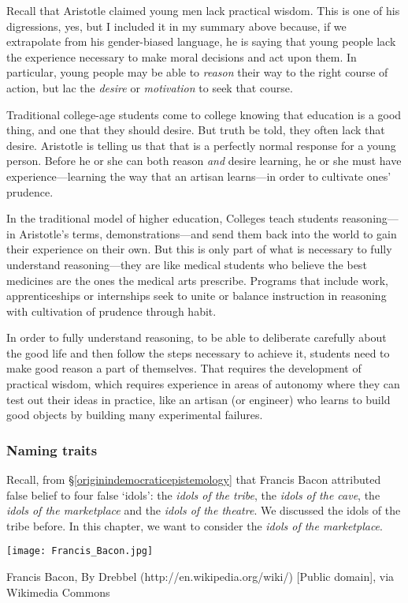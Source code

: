 Recall that Aristotle claimed young men lack practical wisdom. This is one of his digressions, yes, but I included it in my summary above because, if we extrapolate from his gender-biased language, he is saying that young people lack the experience necessary to make moral decisions and act upon them. In particular, young people may be able to \emph{reason} their way to the right course of action, but lac the \emph{desire} or \emph{motivation} to seek that course. 

Traditional college-age students come to college knowing that education is a good thing, and one that they should desire. But truth be told, they often lack that desire. Aristotle is telling us that that is a perfectly normal response for a young person. Before he or she can both reason \emph{and} desire learning, he or she must have experience---learning the way that an artisan learns---in order to cultivate ones' prudence.

In the traditional model of higher education, Colleges teach students reasoning---in Aristotle's terms, demonstrations---and send them back into the world to gain their experience on their own. But this is only part of what is necessary to fully understand reasoning---they are like medical students who believe the best medicines are the ones the medical arts prescribe. Programs that include work, apprenticeships or internships seek to unite or balance instruction in reasoning with cultivation of prudence through habit. 

In order to fully understand reasoning, to be able to deliberate carefully about the good life and then follow the steps necessary to achieve it, students need to make good reason a part of themselves. That requires the development of practical wisdom, which requires experience in areas of autonomy where they can test out their ideas in practice, like an artisan (or engineer) who learns to build good objects by building many experimental failures.

\subsubsection{Naming traits}
\label{namingtraits}

Recall, from \S\ref{originindemocraticepistemology} that Francis Bacon attributed false belief to four false `idols': the \emph{idols of the tribe}, the \emph{idols of the cave}, the \emph{idols of the marketplace} and the \emph{idols of the theatre}. We discussed the idols of the tribe before. In this chapter, we want to consider the \emph{idols of the marketplace}.\begin{marginfigure}\texttt{[image: Francis\_Bacon.jpg]}\caption{Francis Bacon, By Drebbel (http://en.wikipedia.org/wiki/) [Public domain], via Wikimedia Commons}\label{fig:bacon}\end{marginfigure}

